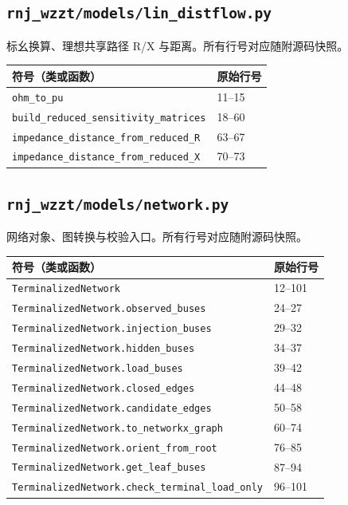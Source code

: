 \subsection{\texorpdfstring{\nolinkurl{rnj_wzzt/models/lin_distflow.py}}{rnj\_wzzt/models/lin\_distflow.py}}\label{module:models.lin_distflow}
标幺换算、理想共享路径 R/X 与距离。所有行号对应随附源码快照。
\begin{longtable}{P{0.73\textwidth}P{0.18\textwidth}}\toprule 符号（类或函数） & 原始行号\\\midrule\endhead
\nolinkurl{ohm_to_pu} & 11--15 \\
\nolinkurl{build_reduced_sensitivity_matrices} & 18--60 \\
\nolinkurl{impedance_distance_from_reduced_R} & 63--67 \\
\nolinkurl{impedance_distance_from_reduced_X} & 70--73 \\
\bottomrule\end{longtable}
\subsection{\texorpdfstring{\nolinkurl{rnj_wzzt/models/network.py}}{rnj\_wzzt/models/network.py}}\label{module:models.network}
网络对象、图转换与校验入口。所有行号对应随附源码快照。
\begin{longtable}{P{0.73\textwidth}P{0.18\textwidth}}\toprule 符号（类或函数） & 原始行号\\\midrule\endhead
\nolinkurl{TerminalizedNetwork} & 12--101 \\
\nolinkurl{TerminalizedNetwork.observed_buses} & 24--27 \\
\nolinkurl{TerminalizedNetwork.injection_buses} & 29--32 \\
\nolinkurl{TerminalizedNetwork.hidden_buses} & 34--37 \\
\nolinkurl{TerminalizedNetwork.load_buses} & 39--42 \\
\nolinkurl{TerminalizedNetwork.closed_edges} & 44--48 \\
\nolinkurl{TerminalizedNetwork.candidate_edges} & 50--58 \\
\nolinkurl{TerminalizedNetwork.to_networkx_graph} & 60--74 \\
\nolinkurl{TerminalizedNetwork.orient_from_root} & 76--85 \\
\nolinkurl{TerminalizedNetwork.get_leaf_buses} & 87--94 \\
\nolinkurl{TerminalizedNetwork.check_terminal_load_only} & 96--101 \\
\bottomrule\end{longtable}
